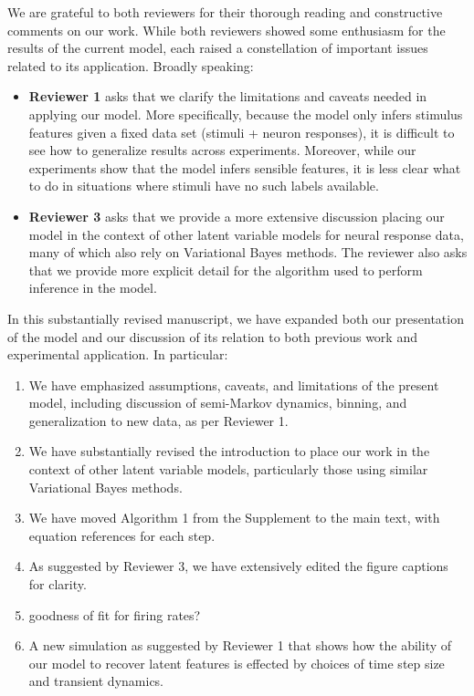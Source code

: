 \documentclass[12pt,a4paper]{article}
\newcommand{\edit}[1]{\textcolor{edit}{#1}}
\begin{document}
\edit{We are grateful to both reviewers for their thorough reading and constructive comments on our work. While both reviewers showed some enthusiasm for the results of the current model, each raised a constellation of important issues related to its application. Broadly speaking:
\begin{itemize}
    \item {\bf Reviewer 1} asks that we clarify the limitations and caveats needed in applying our model. More specifically, because the model only infers stimulus features given a fixed data set (stimuli + neuron responses), it is difficult to see how to generalize results across experiments. Moreover, while our experiments show that the model infers sensible features, it is less clear what to do in situations where stimuli have no such labels available.
    \item {\bf Reviewer 3} asks that we provide a more extensive discussion placing our model in the context of other latent variable models for neural response data, many of which also rely on Variational Bayes methods. The reviewer also asks that we provide more explicit detail for the algorithm used to perform inference in the model.
\end{itemize}
}

\edit{In this substantially revised manuscript, we have expanded both our presentation of the model and our discussion of its relation to both previous work and experimental application. In particular:
\begin{enumerate}
    \item We have emphasized assumptions, caveats, and limitations of the present model, including discussion of semi-Markov dynamics, binning, and generalization to new data, as per Reviewer 1.
    \item We have substantially revised the introduction to place our work in the context of other latent variable models, particularly those using similar Variational Bayes methods.
    \item We have moved Algorithm 1 from the Supplement to the main text, with equation references for each step.
    \item As suggested by Reviewer 3, we have extensively edited the figure captions for clarity.
    \item {\color{red} goodness of fit for firing rates?}
    \item A new simulation as suggested by Reviewer 1 that shows how the ability of our model to recover latent features is effected by choices of time step size and transient dynamics.
\end{enumerate}
}
\end{document}
